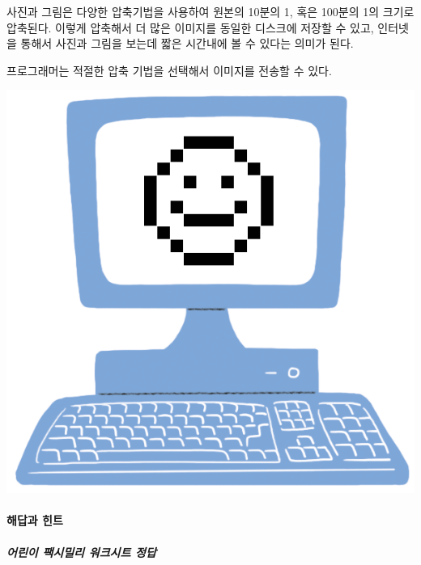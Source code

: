 \documentclass[]{article}
\begin{document}
사진과 그림은 다양한 압축기법을 사용하여 원본의 10분의 1, 혹은 100분의
1의 크기로 압축된다. 이렇게 압축해서 더 많은 이미지를 동일한 디스크에
저장할 수 있고, 인터넷을 통해서 사진과 그림을 보는데 짧은 시간내에 볼 수
있다는 의미가 된다.

프로그래머는 적절한 압축 기법을 선택해서 이미지를 전송할 수 있다.

\includegraphics{csunplugged/01-part/img/ch02-img/02-image-05-core-concept.png}

\mbox{}\paragraph{해답과 힌트}\label{section-41}

\subparagraph{어린이 팩시밀리 워크시트 정답}\label{section-42}
\end{document}
